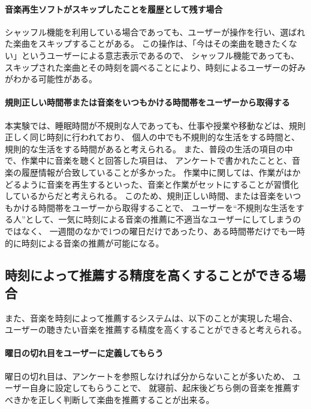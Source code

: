 \documentclass[a4paper, 11pt, onecolumn, report]{jsarticle}
\begin{document}
\paragraph{音楽再生ソフトがスキップしたことを履歴として残す場合}
シャッフル機能を利用している場合であっても、ユーザーが操作を行い、選ばれた楽曲をスキップすることがある。
この操作は、「今はその楽曲を聴きたくない」というユーザーによる意志表示であるので、
シャッフル機能であっても、スキップされた楽曲とその時刻を調べることにより、時刻によるユーザーの好みがわかる可能性がある。

\paragraph{規則正しい時間帯または音楽をいつもかける時間帯をユーザーから取得する}
本実験では、睡眠時間が不規則な人であっても、仕事や授業や移動などは、規則正しく同じ時刻に行われており、
個人の中でも不規則的な生活をする時間と、規則的な生活をする時間があると考えられる。
また、普段の生活の項目の中で、作業中に音楽を聴くと回答した項目は、
アンケートで書かれたことと、音楽の履歴情報が合致していることが多かった。
作業中に関しては、作業がはかどるように音楽を再生するといった、音楽と作業がセットにすることが習慣化しているからだと考えられる。
このため、規則正しい時間、または音楽をいつもかける時間帯をユーザーから取得することで、
ユーザーを``不規則な生活をする人''として、一気に時刻による音楽の推薦に不適当なユーザーにしてしまうのではなく、
一週間のなかで1つの曜日だけであったり、ある時間帯だけでも一時的に時刻による音楽の推薦が可能になる。

\subsection{時刻によって推薦する精度を高くすることができる場合} 
また、音楽を時刻によって推薦するシステムは、以下のことが実現した場合、
ユーザーの聴きたい音楽を推薦する精度を高くすることができると考えられる。
\paragraph{曜日の切れ目をユーザーに定義してもらう}
曜日の切れ目は、アンケートを参照しなければ分からないことが多いため、
ユーザー自身に設定してもらうことで、
就寝前、起床後どちら側の音楽を推薦すべきかを正しく判断して楽曲を推薦することが出来る。
\end{document}
